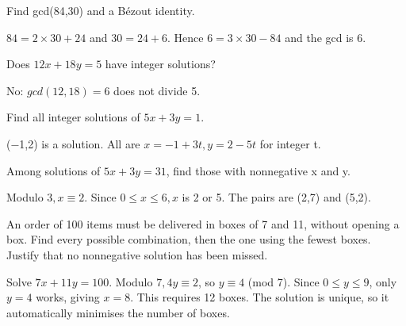 \documentclass[11pt]{article}
\begin{document}
Find gcd(84,30) and a Bézout identity.\par
\(84 = 2 \times  30 + 24\) and \(30 = 24 + 6\). Hence \(6 = 3 \times  30 - 84\) and the gcd is 6.\par
{}
Does \(12x + 18y = 5\) have integer solutions?\par
No: \(gcd(12,18) = 6\) does not divide 5.\par
{}
Find all integer solutions of \(5x + 3y = 1\).\par
(−1,2) is a solution. All are \(x = -1 + 3t, y = 2 - 5t\) for integer t.\par
{}
Among solutions of \(5x + 3y = 31\), find those with nonnegative x and y.\par
Modulo \(3, x \equiv  2\). Since \(0 \leq  x \leq  6, x\) is 2 or 5. The pairs are (2,7) and (5,2).\par
{}
An order of 100 items must be delivered in boxes of 7 and 11, without opening a box. Find every possible combination, then the one using the fewest boxes. Justify that no nonnegative solution has been missed.\par
Solve \(7x + 11y = 100\). Modulo \(7, 4y \equiv  2\), so \(y \equiv  4\) (mod 7). Since \(0 \leq  y \leq  9\), only \(y = 4\) works, giving \(x = 8\). This requires 12 boxes. The solution is unique, so it automatically minimises the number of boxes.\par
\end{document}
